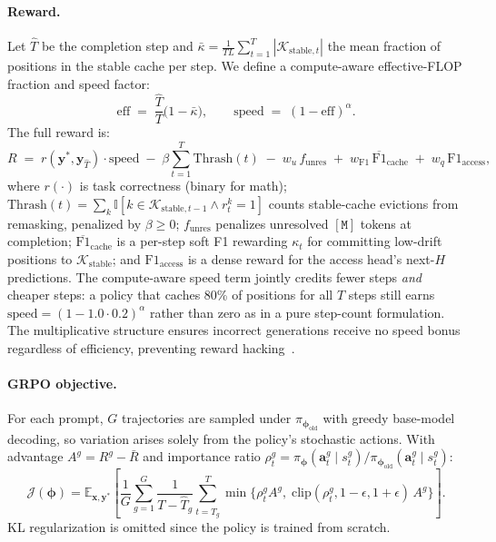 \documentclass[11pt]{article}
\newcommand{\E}{\mathbb{E}}
\newcommand{\cK}{\mathcal{K}}
\newcommand{\cJ}{\mathcal{J}}
\newcommand{\bphi}{\bm{\phi}}
\newcommand{\bx}{\mathbf{x}}
\newcommand{\by}{\mathbf{y}}
\newcommand{\ind}{\mathbb{I}}
\newcommand{\mask}{\ensuremath{\mathtt{[M]}}}
\begin{document}
\paragraph{Reward.}
Let $\hat{T}$ be the completion step and $\bar{\kappa} = \frac{1}{TL}\sum_{t=1}^{T}|\cK_{\mathrm{stable},t}|$ the mean fraction of positions in the stable cache per step.
We define a compute-aware effective-FLOP fraction and speed factor:
\begin{equation}
    \mathrm{eff} \;=\; \frac{\hat{T}}{T}\bigl(1 - \bar{\kappa}\bigr),
    \qquad
    \mathrm{speed} \;=\; (1 - \mathrm{eff})^{\alpha}.
    \label{eq:speed}
\end{equation}
The full reward is:
\begin{equation}
    R \;=\; r(\by^*, \by_{\hat{T}}) \cdot \mathrm{speed}
      \;-\; \beta \sum_{t=1}^{T} \mathrm{Thrash}(t)
      \;-\; w_u\, f_{\mathrm{unres}}
      \;+\; w_{\mathrm{F1}}\, \overline{\mathrm{F1}}_{\mathrm{cache}}
      \;+\; w_q\, \mathrm{F1}_{\mathrm{access}},
    \label{eq:reward}
\end{equation}
where $r(\cdot)$ is task correctness (binary for math); $\mathrm{Thrash}(t) = \sum_k \ind[k \in \cK_{\mathrm{stable},t-1} \land r_t^k = 1]$ counts stable-cache evictions from remasking, penalized by $\beta \geq 0$; $f_{\mathrm{unres}}$ penalizes unresolved \mask{} tokens at completion; $\overline{\mathrm{F1}}_{\mathrm{cache}}$ is a per-step soft F1 rewarding $\kappa_t$ for committing low-drift positions to $\cK_{\mathrm{stable}}$; and $\mathrm{F1}_{\mathrm{access}}$ is a dense reward for the access head's next-$H$ predictions.
The compute-aware speed term jointly credits fewer steps \emph{and} cheaper steps: a policy that caches 80\% of positions for all $T$ steps still earns $\mathrm{speed} = (1 - 1.0 \cdot 0.2)^\alpha$ rather than zero as in a pure step-count formulation.
The multiplicative structure ensures incorrect generations receive no speed bonus regardless of efficiency, preventing reward hacking~\cite{jazbec2025learning}.

\paragraph{GRPO objective.}
For each prompt, $G$ trajectories are sampled under $\pi_{\bphi_{\text{old}}}$ with greedy base-model decoding, so variation arises solely from the policy's stochastic actions.
With advantage $A^g = R^g - \bar{R}$ and importance ratio $\rho_t^g = \pi_{\bphi}(\mathbf{a}_t^g \mid s_t^g) / \pi_{\bphi_{\text{old}}}(\mathbf{a}_t^g \mid s_t^g)$:
\begin{equation}
    \cJ(\bphi) = \E_{\bx, \by^*} \left[ \frac{1}{G} \sum_{g=1}^G \frac{1}{T - \hat{T}_g} \sum_{t=\hat{T}_g}^{T} \min\!\Big\{ \rho_t^g A^g,\; \text{clip}(\rho_t^g, 1{-}\epsilon, 1{+}\epsilon)\, A^g \Big\} \right].
    \label{eq:grpo}
\end{equation}
KL regularization is omitted since the policy is trained from scratch.
\end{document}
